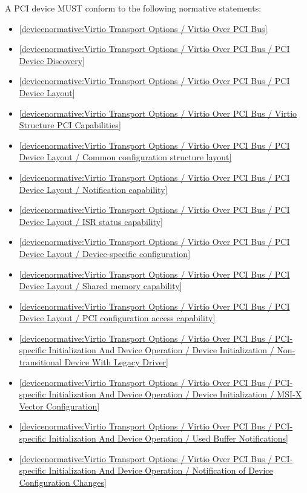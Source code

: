 \label{sec:Conformance / Device Conformance / PCI Device Conformance}

A PCI device MUST conform to the following normative statements:

\begin{itemize}
\item \ref{devicenormative:Virtio Transport Options / Virtio Over PCI Bus}
\item \ref{devicenormative:Virtio Transport Options / Virtio Over PCI Bus / PCI Device Discovery}
\item \ref{devicenormative:Virtio Transport Options / Virtio Over PCI Bus / PCI Device Layout}
\item \ref{devicenormative:Virtio Transport Options / Virtio Over PCI Bus / Virtio Structure PCI Capabilities}
\item \ref{devicenormative:Virtio Transport Options / Virtio Over PCI Bus / PCI Device Layout / Common configuration structure layout}
\item \ref{devicenormative:Virtio Transport Options / Virtio Over PCI Bus / PCI Device Layout / Notification capability}
\item \ref{devicenormative:Virtio Transport Options / Virtio Over PCI Bus / PCI Device Layout / ISR status capability}
\item \ref{devicenormative:Virtio Transport Options / Virtio Over PCI Bus / PCI Device Layout / Device-specific configuration}
\item \ref{devicenormative:Virtio Transport Options / Virtio Over PCI Bus / PCI Device Layout / Shared memory capability}
\item \ref{devicenormative:Virtio Transport Options / Virtio Over PCI Bus / PCI Device Layout / PCI configuration access capability}
\item \ref{devicenormative:Virtio Transport Options / Virtio Over PCI Bus / PCI-specific Initialization And Device Operation / Device Initialization / Non-transitional Device With Legacy Driver}
\item \ref{devicenormative:Virtio Transport Options / Virtio Over PCI Bus / PCI-specific Initialization And Device Operation / Device Initialization / MSI-X Vector Configuration}
\item \ref{devicenormative:Virtio Transport Options / Virtio Over PCI Bus / PCI-specific Initialization And Device Operation / Used Buffer Notifications}
\item \ref{devicenormative:Virtio Transport Options / Virtio Over PCI Bus / PCI-specific Initialization And Device Operation / Notification of Device Configuration Changes}
\end{itemize}

